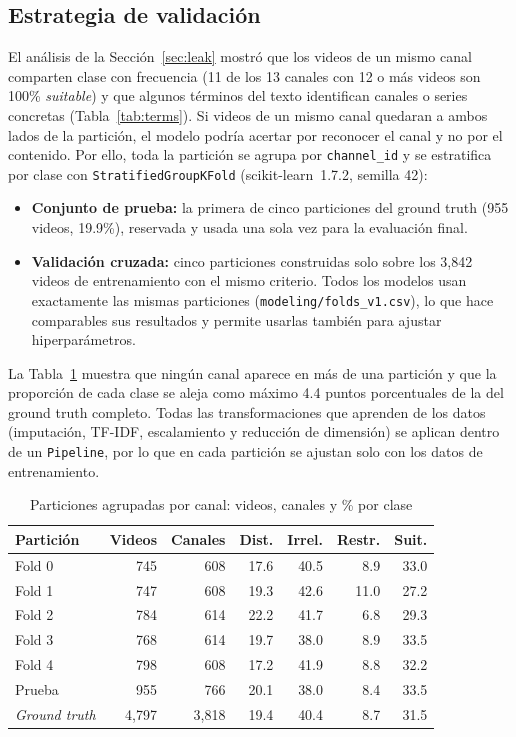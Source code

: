 \documentclass[conference]{IEEEtran}
\begin{document}
\subsection{Estrategia de validación}\label{sec:validacion}
El análisis de la Sección~\ref{sec:leak} mostró que los videos de un mismo canal comparten clase con frecuencia (11 de los 13 canales con 12 o más videos son 100\% \textit{suitable}) y que algunos términos del texto identifican canales o series concretas (Tabla~\ref{tab:terms}). Si videos de un mismo canal quedaran a ambos lados de la partición, el modelo podría acertar por reconocer el canal y no por el contenido. Por ello, toda la partición se agrupa por \texttt{channel\_id} y se estratifica por clase con \texttt{StratifiedGroupKFold} (scikit-learn~1.7.2, semilla 42):
\begin{itemize}
\item \textbf{Conjunto de prueba:} la primera de cinco particiones del ground truth (955 videos, 19.9\%), reservada y usada una sola vez para la evaluación final.
\item \textbf{Validación cruzada:} cinco particiones construidas solo sobre los 3,842 videos de entrenamiento con el mismo criterio. Todos los modelos usan exactamente las mismas particiones (\texttt{modeling/folds\_v1.csv}), lo que hace comparables sus resultados y permite usarlas también para ajustar hiperparámetros.
\end{itemize}
La Tabla~\ref{tab:folds} muestra que ningún canal aparece en más de una partición y que la proporción de cada clase se aleja como máximo 4.4 puntos porcentuales de la del ground truth completo. Todas las transformaciones que aprenden de los datos (imputación, TF-IDF, escalamiento y reducción de dimensión) se aplican dentro de un \texttt{Pipeline}, por lo que en cada partición se ajustan solo con los datos de entrenamiento.

\begin{table}[!t]
\caption{Particiones agrupadas por canal: videos, canales y \% por clase}
\begin{center}
\footnotesize
\setlength{\tabcolsep}{3pt}
\begin{tabular}{|l|r|r|r|r|r|r|}
\hline
\textbf{Partición} & \textbf{Videos} & \textbf{Canales} & \textbf{Dist.} & \textbf{Irrel.} & \textbf{Restr.} & \textbf{Suit.} \\
\hline
Fold 0 & 745 & 608 & 17.6 & 40.5 & 8.9 & 33.0 \\
\hline
Fold 1 & 747 & 608 & 19.3 & 42.6 & 11.0 & 27.2 \\
\hline
Fold 2 & 784 & 614 & 22.2 & 41.7 & 6.8 & 29.3 \\
\hline
Fold 3 & 768 & 614 & 19.7 & 38.0 & 8.9 & 33.5 \\
\hline
Fold 4 & 798 & 608 & 17.2 & 41.9 & 8.8 & 32.2 \\
\hline
Prueba & 955 & 766 & 20.1 & 38.0 & 8.4 & 33.5 \\
\hline
\textit{Ground truth} & 4,797 & 3,818 & 19.4 & 40.4 & 8.7 & 31.5 \\
\hline
\end{tabular}
\label{tab:folds}
\end{center}
\end{table}
\end{document}
